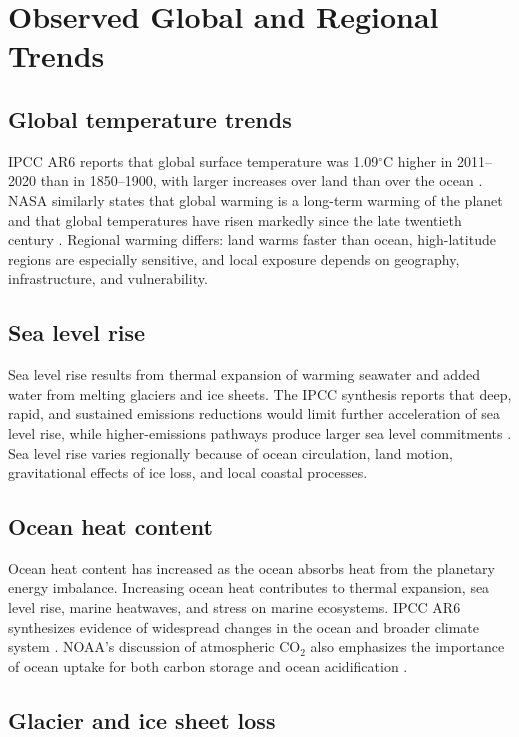 \documentclass[12pt]{article}
\begin{document}
\section{Observed Global and Regional Trends}

\subsection{Global temperature trends}

IPCC AR6 reports that global surface temperature was 1.09$^\circ$C higher in 2011--2020 than in 1850--1900, with larger increases over land than over the ocean \cite{ref1}. NASA similarly states that global warming is a long-term warming of the planet and that global temperatures have risen markedly since the late twentieth century \cite{ref2}. Regional warming differs: land warms faster than ocean, high-latitude regions are especially sensitive, and local exposure depends on geography, infrastructure, and vulnerability.

\subsection{Sea level rise}

Sea level rise results from thermal expansion of warming seawater and added water from melting glaciers and ice sheets. The IPCC synthesis reports that deep, rapid, and sustained emissions reductions would limit further acceleration of sea level rise, while higher-emissions pathways produce larger sea level commitments \cite{ref1}. Sea level rise varies regionally because of ocean circulation, land motion, gravitational effects of ice loss, and local coastal processes.

\subsection{Ocean heat content}

Ocean heat content has increased as the ocean absorbs heat from the planetary energy imbalance. Increasing ocean heat contributes to thermal expansion, sea level rise, marine heatwaves, and stress on marine ecosystems. IPCC AR6 synthesizes evidence of widespread changes in the ocean and broader climate system \cite{ref1,ref6}. NOAA's discussion of atmospheric CO$_2$ also emphasizes the importance of ocean uptake for both carbon storage and ocean acidification \cite{ref3}.

\subsection{Glacier and ice sheet loss}
\end{document}
